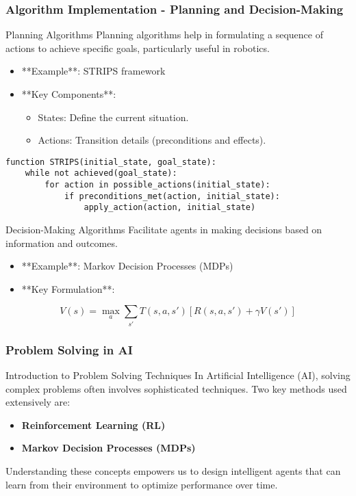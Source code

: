 \documentclass[aspectratio=169]{beamer}
\begin{document}
\begin{frame}[fragile]
    \frametitle{Algorithm Implementation - Planning and Decision-Making}
    \begin{block}{Planning Algorithms}
        Planning algorithms help in formulating a sequence of actions to achieve specific goals, particularly useful in robotics.
        \begin{itemize}
            \item **Example**: STRIPS framework
            \item **Key Components**:
            \begin{itemize}
                \item States: Define the current situation.
                \item Actions: Transition details (preconditions and effects).
            \end{itemize}
        \end{itemize}
    \end{block}
    
    \begin{lstlisting}[language=Plaintext]
function STRIPS(initial_state, goal_state):
    while not achieved(goal_state):
        for action in possible_actions(initial_state):
            if preconditions_met(action, initial_state):
                apply_action(action, initial_state)
    \end{lstlisting}
    
    \begin{block}{Decision-Making Algorithms}
        Facilitate agents in making decisions based on information and outcomes.
        \begin{itemize}
            \item **Example**: Markov Decision Processes (MDPs)
            \item **Key Formulation**:
            \end{itemize}
            \begin{equation}
                V(s) = \max_a \sum_{s'} T(s, a, s') [R(s, a, s') + \gamma V(s')]
            \end{equation}
    \end{block}
\end{frame}

\begin{frame}[fragile]
    \frametitle{Problem Solving in AI}
    \begin{block}{Introduction to Problem Solving Techniques}
        In Artificial Intelligence (AI), solving complex problems often involves sophisticated techniques. Two key methods used extensively are:
        \begin{itemize}
            \item \textbf{Reinforcement Learning (RL)}
            \item \textbf{Markov Decision Processes (MDPs)}
        \end{itemize}
        Understanding these concepts empowers us to design intelligent agents that can learn from their environment to optimize performance over time.
    \end{block}
\end{frame}
\end{document}
